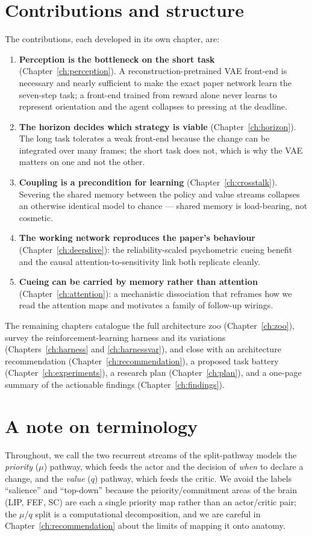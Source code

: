 \section{Contributions and structure}
The contributions, each developed in its own chapter, are:
\begin{enumerate}
\item \textbf{Perception is the bottleneck on the short task} (Chapter~\ref{ch:perception}).
A reconstruction-pretrained VAE front-end is necessary and nearly sufficient to make the
exact paper network learn the seven-step task; a front-end trained from reward alone never
learns to represent orientation and the agent collapses to pressing at the deadline.
\item \textbf{The horizon decides which strategy is viable} (Chapter~\ref{ch:horizon}).
The long task tolerates a weak front-end because the change can be integrated over many
frames; the short task does not, which is why the VAE matters on one and not the other.
\item \textbf{Coupling is a precondition for learning} (Chapter~\ref{ch:crosstalk}).
Severing the shared memory between the policy and value streams collapses an otherwise
identical model to chance --- shared memory is load-bearing, not cosmetic.
\item \textbf{The working network reproduces the paper's behaviour}
(Chapter~\ref{ch:deepdive}): the reliability-scaled psychometric cueing benefit and the
causal attention-to-sensitivity link both replicate cleanly.
\item \textbf{Cueing can be carried by memory rather than attention}
(Chapter~\ref{ch:attention}): a mechanistic dissociation that reframes how we read the
attention maps and motivates a family of follow-up wirings.
\end{enumerate}
The remaining chapters catalogue the full architecture zoo
(Chapter~\ref{ch:zoo}), survey the reinforcement-learning harness and its variations
(Chapters~\ref{ch:harness} and \ref{ch:harnessvar}), and close with an architecture
recommendation (Chapter~\ref{ch:recommendation}), a proposed task battery
(Chapter~\ref{ch:experiments}), a research plan (Chapter~\ref{ch:plan}), and a one-page
summary of the actionable findings (Chapter~\ref{ch:findings}).

\section{A note on terminology}
Throughout, we call the two recurrent streams of the split-pathway models the
\emph{priority} ($\mu$) pathway, which feeds the actor and the decision of \emph{when} to
declare a change, and the \emph{value} ($q$) pathway, which feeds the critic. We avoid the
labels ``salience'' and ``top-down'' because the priority/commitment areas of the brain
(LIP, FEF, SC) are each a single priority map rather than an actor/critic pair; the
$\mu$/$q$ split is a computational decomposition, and we are careful in
Chapter~\ref{ch:recommendation} about the limits of mapping it onto anatomy.
